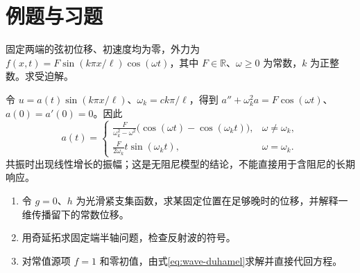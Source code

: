 \section{例题与习题}
\begin{example}
固定两端的弦初位移、初速度均为零，外力为 $f(x,t)=F\sin(k\pi x/\ell)\cos(\omega t)$，其中 $F\in\mathbb R$、$\omega\ge0$ 为常数，$k$ 为正整数。求受迫解。
\end{example}
\begin{solve}
令 $u=a(t)\sin(k\pi x/\ell)$、$\omega_k=ck\pi/\ell$，得到 $a''+\omega_k^2a=F\cos(\omega t)$、$a(0)=a'(0)=0$。因此
\[
 a(t)=\begin{cases}
 \displaystyle\frac{F}{\omega_k^2-\omega^2}\bigl(\cos(\omega t)-\cos(\omega_kt)\bigr),&\omega\ne\omega_k,\\
 \displaystyle\frac{F}{2\omega_k}t\sin(\omega_kt),&\omega=\omega_k.
 \end{cases}
\]
共振时出现线性增长的振幅；这是无阻尼模型的结论，不能直接用于含阻尼的长期响应。
\end{solve}
\begin{enumerate}
 \item 令 $g=0$、$h$ 为光滑紧支集函数，求某固定位置在足够晚时的位移，并解释一维传播留下的常数位移。
 \item 用奇延拓求固定端半轴问题，检查反射波的符号。
 \item 对常值源项 $f=1$ 和零初值，由式\eqref{eq:wave-duhamel}求解并直接代回方程。
\end{enumerate}

